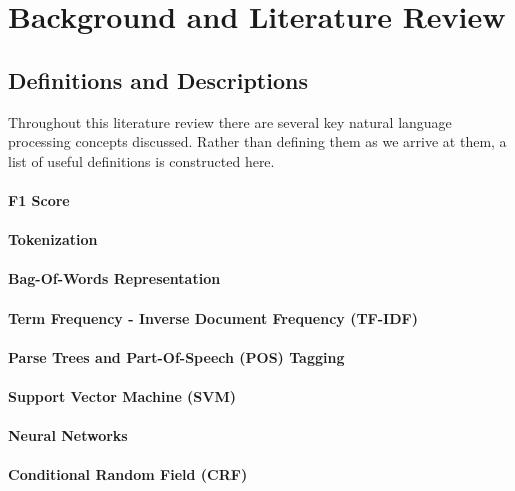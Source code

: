 \chapter{Background and Literature Review}

\section{Definitions and Descriptions}
Throughout this literature review there are several key natural language processing concepts discussed. Rather than defining them as we arrive at them, a list of useful definitions is constructed here.

\subsubsection*{F1 Score}

\subsubsection*{Tokenization}

\subsubsection*{Bag-Of-Words Representation}

\subsubsection*{Term Frequency - Inverse Document Frequency (TF-IDF)}

\subsubsection*{Parse Trees and Part-Of-Speech (POS) Tagging}

\subsubsection*{Support Vector Machine (SVM)}

\subsubsection*{Neural Networks}

\subsubsection*{Conditional Random Field (CRF)}

